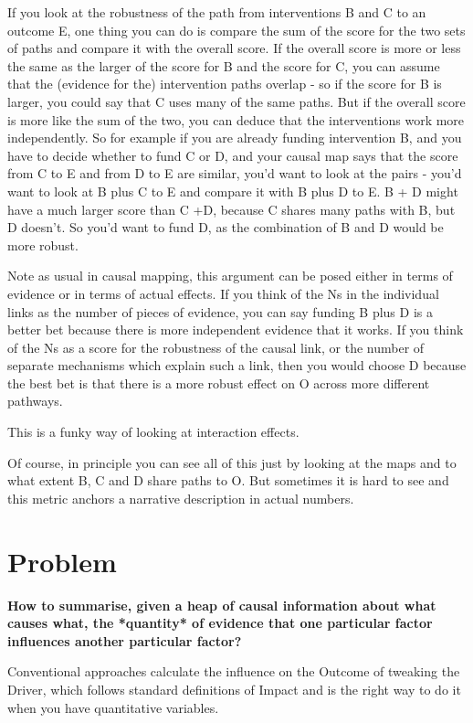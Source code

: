 \documentclass[
]{book}
\begin{document}
If you look at the robustness of the path from interventions B and C to an outcome E, one thing you can do is compare the sum of the score for the two sets of paths and compare it with the overall score. If the overall score is more or less the same as the larger of the score for B and the score for C, you can assume that the (evidence for the) intervention paths overlap - so if the score for B is larger, you could say that C uses many of the same paths. But if the overall score is more like the sum of the two, you can deduce that the interventions work more independently. So for example if you are already funding intervention B, and you have to decide whether to fund C or D, and your causal map says that the score from C to E and from D to E are similar, you'd want to look at the pairs - you'd want to look at B plus C to E and compare it with B plus D to E. B + D might have a much larger score than C +D, because C shares many paths with B, but D doesn't. So you'd want to fund D, as the combination of B and D would be more robust.

Note as usual in causal mapping, this argument can be posed either in terms of evidence or in terms of actual effects. If you think of the Ns in the individual links as the number of pieces of evidence, you can say funding B plus D is a better bet because there is more independent evidence that it works. If you think of the Ns as a score for the robustness of the causal link, or the number of separate mechanisms which explain such a link, then you would choose D because the best bet is that there is a more robust effect on O across more different pathways.

This is a funky way of looking at interaction effects.

Of course, in principle you can see all of this just by looking at the maps and to what extent B, C and D share paths to O. But sometimes it is hard to see and this metric anchors a narrative description in actual numbers.

\hypertarget{problem}{%
\section{Problem}\label{problem}}

\textbf{How to summarise, given a heap of causal information about what causes what, the *quantity* of evidence that one particular factor influences another particular factor?}

Conventional approaches calculate the influence on the Outcome of tweaking the Driver, which follows standard definitions of Impact and is the right way to do it when you have quantitative variables.
\end{document}
